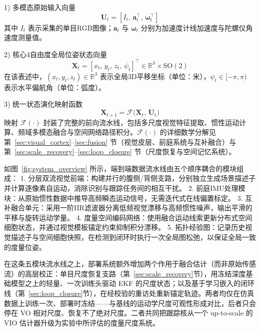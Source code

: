 1) 多模态原始输入向量
\begin{equation}
    \mathbf{U}_t = \left[ I_t,\, \mathbf{a}_t^\top,\, \boldsymbol{\omega}_t^\top \right]
    \label{eq:input_vec}
\end{equation}
其中 $I_t$ 表示采集的单目RGB图像；$\mathbf{a}_t$ 与 $\boldsymbol{\omega}_t$ 分别为加速度计线加速度与陀螺仪角速度测量值。

2) 核心4自由度全局位姿状态向量
\begin{equation}
    \mathbf{X}_t = \left[ x_t,\, y_t,\, z_t,\, \psi_t \right]^\top \in \mathbb{R}^3 \times \mathrm{SO}(2)
    \label{eq:global_state}
\end{equation}
在该表述中，$(x_t, y_t, z_t) \in \mathbb{R}^3$ 表示全局3D平移坐标（单位：米），$\psi_t \in [-\pi,\pi)$ 表示水平偏航角（单位：弧度）。

3) 统一状态演化映射函数
\begin{equation}
    \mathbf{X}_{t+1} = \mathcal{F}\big(\mathbf{X}_t,\, \mathbf{U}_t\big)
    \label{eq:state_evolution}
\end{equation}
映射 $\mathcal{F}(\cdot)$ 封装了完整的前向流水线，包括多尺度视觉特征提取、惯性运动计算、频域多模态融合与空间网络路径积分。$\mathcal{F}(\cdot)$ 的详细数学分解见第~\ref{sec:visual_cortex}--\ref{sec:fusion} 节（视觉皮层、前庭系统与互补融合）与第~\ref{sec:scale_recovery}--\ref{sec:loop_closure} 节（尺度恢复与空间记忆系统）。

如图~\ref{fig:system_overview} 所示，端到端数据流水线由五个顺序耦合的模块组成：
1. 分层双流视觉前端：构建并行的腹侧/背侧支路，分别独立生成场景描述子并计算逐像素自运动，消除识别与跟踪任务间的相互干扰。
2. 前庭IMU处理模块：从原始惯性数据中推导高频瞬态运动信号，无需迭代式在线偏置标定。
3. 互补融合单元：采用一阶IIR滤波器分离低频视觉漂移与高频惯性噪声，输出平滑的平移与旋转运动学量。
4. 度量空间编码网络：使用融合运动线索更新分布式空间细胞状态，并通过视觉模板锚定约束抑制积分漂移。
5. 拓扑经验图：记录历史视觉描述子与空间细胞快照，在检测到闭环时执行一次全局图松弛，以保证全局一致的度量位姿。

\noindent 在这条五模块流水线之上，部署系统额外增加两个作用于融合估计（而非原始传感流）的高层校正：单目尺度恢复支路（第~\ref{sec:scale_recovery}节），用冻结深度基础模型之上的轻量、一次训练头驱动 EKF 的尺度状态；以及基于学习嵌入的闭环线（第~\ref{sec:loop_closure}节），在经校验的重访处重新锚定轨迹。两者均仅在仿真数据上训练一次、部署时冻结——与基线的运动学尺度可观性形成对比，后者只会停在 VO 相对尺度、恢复不了绝对尺度。二者共同把跟踪核从一个 up-to-scale 的 VIO 估计器升级为实验中所评估的度量尺度系统。


